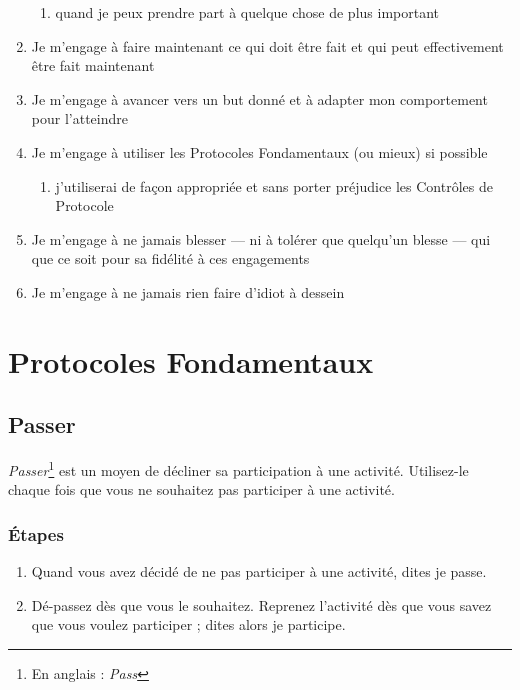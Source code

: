 \documentclass[paper=6in:9in,pagesize=pdftex,headinclude=on,footinclude=on,12pt]{scrbook}
\begin{document}
\begin{enumerate}
\begin{enumerate}
		\item quand je peux prendre part à quelque chose de plus important
	\end{enumerate}
	\item Je m'engage à faire maintenant ce qui doit être fait et qui peut effectivement être fait maintenant
	\item Je m'engage à avancer vers un but donné et à adapter mon comportement pour l'atteindre
	\item Je m'engage à utiliser les Protocoles Fondamentaux (ou mieux) si possible
	\begin{enumerate}
		\item j'utiliserai de façon appropriée et sans porter préjudice les Contrôles de Protocole
	\end{enumerate}
	\item Je m'engage à ne jamais blesser --- ni à tolérer que quelqu'un blesse --- qui que ce soit pour sa fidélité à ces engagements
	\item Je m'engage à ne jamais rien faire d'idiot à dessein
\end{enumerate}

\chapter{Protocoles Fondamentaux} \label{core-protocols}

\section{Passer} \label{protocole-passer}

\emph{Passer}\footnote{En anglais : \emph{Pass}} est un moyen de décliner sa participation à une activité. Utilisez-le chaque fois que vous ne souhaitez pas
participer à une activité.

\subsection{Étapes}
\begin{enumerate}
	\item Quand vous avez décidé de ne pas participer à une activité, dites \og{}je passe\fg{}.
	\item \og{}Dé-passez\fg{} dès que vous le souhaitez. Reprenez l'activité dès que vous savez que vous voulez participer ;
	      dites alors \og{}je participe\fg{}.
\end{enumerate}
\end{document}
